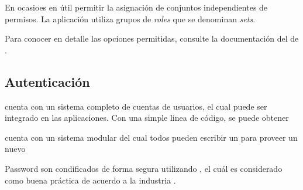 

En ocasioes en útil permitir la asignación de conjuntos independientes de permisos. La aplicación utiliza grupos de \textit{roles} que se denominan \textit{sets}.

Para conocer en detalle las opciones permitidas, consulte la documentación del \packageAS  de \meteorNAME \alanningRolesPackage.


\subsection{Autenticación}

\meteorNAME cuenta con un sistema completo de cuentas de usuarios, el cual puede ser integrado en las aplicaciones. Con una simple linea de código, se puede obtener \


\meteorNAME cuenta con un sistema modular del cual todos pueden escribir un \packageAS para proveer un nuevo

Password son condificados de forma segura utilizando \bcriptCPT, el cuál es considerado como buena práctica de acuerdo a la industria \cite{online_meteor_accounts}.


